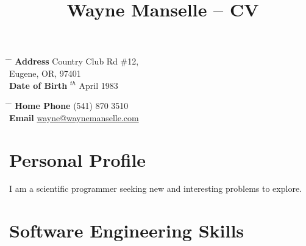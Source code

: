 \documentclass[10pt]{article} %
\begin{document}

\title{Wayne Manselle -- CV} %


\parbox{0.5\textwidth}{ %
\begin{tabbing} %
\hspace{3cm} \= \hspace{4cm} \= \kill %
{\bf Address}  Country Club Rd \#12,\\ %
\> Eugene, OR, 97401 \\ %
{\bf Date of Birth} $^{th}$ April 1983 \\ %
\end{tabbing}}
\hfill %
\parbox{0.5\textwidth}{ %
\begin{tabbing} %
\hspace{3cm} \= \hspace{4cm} \= \kill %
{\bf Home Phone} \> (541) 870 3510 \\ %
{\bf Email} \> \href{mailto:wayne@waynemanselle.com}{wayne@waynemanselle.com} \\ %
\end{tabbing}}


\section{Personal Profile}

I am a scientific programmer seeking new and interesting problems to explore.


\section{Software Engineering Skills}
\end{document}
